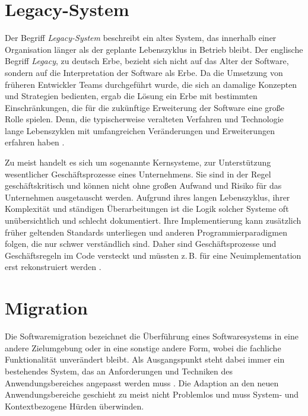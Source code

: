 \section{Legacy-System}

	Der Begriff \textit{Legacy-System} beschreibt ein altes System, das innerhalb einer Organisation länger als der geplante Lebenszyklus in Betrieb bleibt. Der englische Begriff \textit{Legacy}, zu deutsch Erbe, bezieht sich nicht auf das Alter der Software, sondern auf die Interpretation der Software als Erbe. Da die Umsetzung von früheren Entwickler Teams durchgeführt wurde, die sich an damalige Konzepten und Strategien bedienten, ergab die Lösung ein Erbe mit bestimmten Einschränkungen, die für die zukünftige Erweiterung der Software eine große Rolle spielen. Denn, die typischerweise veralteten Verfahren und Technologie lange Lebenszyklen mit umfangreichen Veränderungen und Erweiterungen erfahren haben \cite{sneed2016softwaremigration}. \bigbreak

	Zu meist handelt es sich um sogenannte Kernsysteme, zur Unterstützung wesentlicher Geschäftsprozesse eines Unternehmens. Sie sind in der Regel geschäftskritisch und können nicht ohne großen Aufwand und Risiko für das Unternehmen ausgetauscht werden. Aufgrund ihres langen Lebenszyklus, ihrer Komplexität und ständigen Überarbeitungen ist die Logik solcher Systeme oft unübersichtlich und schlecht dokumentiert. Ihre Implementierung kann zusätzlich früher geltenden Standards unterliegen und anderen Programmierparadigmen folgen, die nur schwer verständlich sind. Daher sind Geschäftsprozesse und Geschäftsregeln im Code versteckt und müssten z.\,B. für eine Neuimplementation erst rekonstruiert werden \cite{martens2016ablosung}.

\section{Migration} \label{ssub:migration}

	Die Softwaremigration bezeichnet die Überführung eines Softwaresystems in eine andere Zielumgebung oder in eine sonstige andere Form, wobei die fachliche Funktionalität unverändert bleibt. Als Ausgangspunkt steht dabei immer ein bestehendes System, das an Anforderungen und Techniken des Anwendungsbereiches angepasst werden muss \cite{sneed2016softwaremigration}. Die Adaption an den neuen Anwendungsbereiche geschieht zu meist nicht Problemlos und muss System- und Kontextbezogene Hürden überwinden. 

